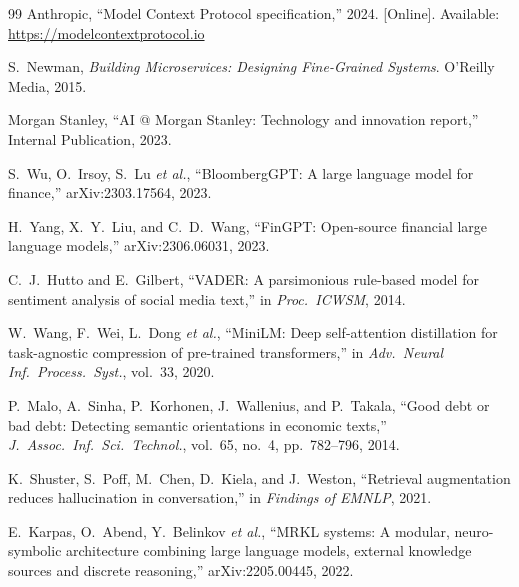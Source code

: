 \documentclass[10pt,twocolumn]{article}
\begin{document}
\begin{thebibliography}{99}
Anthropic,
``Model Context Protocol specification,''
2024. [Online]. Available: \url{https://modelcontextprotocol.io}

S.~Newman,
\emph{Building Microservices: Designing Fine-Grained Systems}.
O'Reilly Media, 2015.

Morgan Stanley,
``AI @ Morgan Stanley: Technology and innovation report,''
Internal Publication, 2023.

S.~Wu, O.~Irsoy, S.~Lu \emph{et al.},
``BloombergGPT: A large language model for finance,''
arXiv:2303.17564, 2023.

H.~Yang, X.~Y.~Liu, and C.~D.~Wang,
``FinGPT: Open-source financial large language models,''
arXiv:2306.06031, 2023.

C.~J.~Hutto and E.~Gilbert,
``VADER: A parsimonious rule-based model for sentiment analysis of
social media text,''
in \emph{Proc.\ ICWSM}, 2014.

W.~Wang, F.~Wei, L.~Dong \emph{et al.},
``MiniLM: Deep self-attention distillation for task-agnostic compression
of pre-trained transformers,''
in \emph{Adv.\ Neural Inf.\ Process.\ Syst.}, vol.~33, 2020.

P.~Malo, A.~Sinha, P.~Korhonen, J.~Wallenius, and P.~Takala,
``Good debt or bad debt: Detecting semantic orientations in economic
texts,''
\emph{J.~Assoc.\ Inf.\ Sci.\ Technol.}, vol.~65, no.~4,
pp.~782--796, 2014.

K.~Shuster, S.~Poff, M.~Chen, D.~Kiela, and J.~Weston,
``Retrieval augmentation reduces hallucination in conversation,''
in \emph{Findings of EMNLP}, 2021.

E.~Karpas, O.~Abend, Y.~Belinkov \emph{et al.},
``MRKL systems: A modular, neuro-symbolic architecture combining large
language models, external knowledge sources and discrete reasoning,''
arXiv:2205.00445, 2022.

\end{thebibliography}
\end{document}
